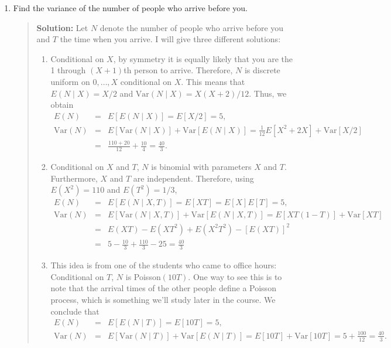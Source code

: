\documentclass{article}
\def\Var{{\mbox{Var}}}
\begin{document}
\begin{enumerate}
\begin{enumerate}
    \item Find the variance of the number of people who arrive before you.
      \begin{quotation} {\bf Solution:}
      Let $N$ denote the number of people who arrive before you and $T$ the time
      when you arrive.  I will give three different solutions:
      \begin{enumerate}
      \item  
      Conditional on $X$, by symmetry it is equally likely that you are the 1 through
      $(X+1)$th person to arrive.  Therefore, $N$ is discrete uniform on $0, \ldots, X$
      conditional on $X$.  This means that $E(N\mid X)=X/2$ and $\Var(N\mid X)=X(X+2)/12$.
      Thus, we obtain
      \begin{eqnarray*}
      E(N) &=&  E[E(N\mid X)] = E[X/2] = 5, \\
      \Var(N) &=& E[\Var(N \mid X)] + \Var[E(N\mid X)] = 
      \frac1{12}E[X^2+2X] + \Var[X/2] \\
      &=&
      \frac{110 + 20}{12} + \frac{10}{4} 
      =\frac{40}{3}.
      \end{eqnarray*}
      \item
      Conditional on $X$ and $T$, $N$ is binomial with parameters $X$ and $T$.
      Furthermore, $X$ and $T$ are independent.
      Therefore, using $E(X^2)=110$ and $E(T^2)=1/3$,
      \begin{eqnarray*}
      E(N) &=&  E[E(N\mid X,T)] = E[XT] = E[X]E[T] = 5, \\
      \Var(N) &=& E[\Var(N \mid X,T)] + \Var[E(N\mid X,T)] = 
      E[XT(1-T)] + \Var[XT] \\
      &=& E(XT) - E(XT^2) + E(X^2T^2) - [E(XT)]^2 \\ 
      &=& 5 - \frac{10}{3} + \frac{110}{3} - 25 = \frac{40}{3}
      \end{eqnarray*}
      \item
      This idea is from one of the students who came to office hours:
      Conditional on $T$, $N$ is Poisson$(10T)$.  One way to see this 
      is to note that the arrival times of the other people define a Poisson process,
      which is something we'll study later in the course.
      We conclude that
      \begin{eqnarray*}
      E(N) &=&  E[E(N\mid T)] = E[10T] = 5, \\
      \Var(N) &=& E[\Var(N \mid T)] + \Var[E(N\mid T)] = 
      E[10T] + \Var[10T] = 5 + \frac{100}{12} = \frac{40}{3}.
      \end{eqnarray*}
      \end{enumerate}
      \end{quotation}


\end{enumerate}
\end{enumerate}
\end{document}
